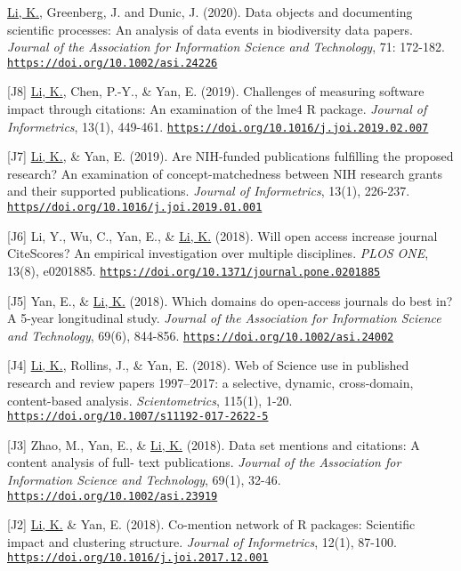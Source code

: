 \documentclass[margin, 10pt]{res} %
\begin{document}
\begin{resume}
[J9] \underline{Li, K.}, Greenberg, J. and Dunic, J. (2020). Data objects and documenting scientific processes: An analysis of data events in biodiversity data papers. \textit{Journal of the Association for Information Science and Technology}, 71: 172-182. \href{https://doi.org/10.1002/asi.24226}{\nolinkurl{https://doi.org/10.1002/asi.24226}}

[J8] \underline{Li, K.}, Chen, P.-Y., \& Yan, E. (2019). Challenges of measuring software impact through citations: An examination of the lme4 R package. \textit{Journal of Informetrics}, 13(1), 449-461. \href{https://doi.org/10.1016/j.joi.2019.02.007}{\nolinkurl{https://doi.org/10.1016/j.joi.2019.02.007}}

[J7] \underline{Li, K.}, \& Yan, E. (2019). Are NIH-funded publications fulfilling the proposed research? An examination of concept-matchedness between NIH research grants and their supported publications. \textit{Journal of Informetrics}, 13(1), 226-237. \href{https//doi.org/10.1016/j.joi.2019.01.001}{\nolinkurl{https//doi.org/10.1016/j.joi.2019.01.001}}

[J6] Li, Y., Wu, C., Yan, E., \& \underline{Li, K.} (2018). Will open access increase journal CiteScores? An empirical investigation over multiple disciplines. \textit{PLOS ONE}, 13(8), e0201885. \href{https://doi.org/10.1371/journal.pone.0201885}{\nolinkurl{https://doi.org/10.1371/journal.pone.0201885}}

[J5] Yan, E., \& \underline{Li, K.} (2018). Which domains do open-access journals do best in? A 5-year longitudinal study. \textit{Journal of the Association for Information Science and Technology}, 69(6), 844-856. \href{https://doi.org/10.1002/asi.24002}{\nolinkurl{https://doi.org/10.1002/asi.24002}}

[J4] \underline{Li, K.}, Rollins, J., \& Yan, E. (2018). Web of Science use in published research and review papers 1997–2017: a selective, dynamic, cross-domain, content-based analysis. \textit{Scientometrics}, 115(1), 1-20. \href{https://doi.org/10.1007/s11192-017-2622-5}{\nolinkurl{https://doi.org/10.1007/s11192-017-2622-5}} 

[J3] Zhao, M., Yan, E., \& \underline{Li, K.} (2018). Data set mentions and citations: A content analysis of full- text publications. \textit{Journal of the Association for Information Science and Technology}, 69(1), 32-46. \href{https://doi.org/10.1002/asi.23919}{\nolinkurl{https://doi.org/10.1002/asi.23919}}

[J2] \underline{Li, K.} \& Yan, E. (2018). Co-mention network of R packages: Scientific impact and clustering structure. \textit{Journal of Informetrics}, 12(1), 87-100. \href{https://doi.org/10.1016/j.joi.2017.12.001}{\nolinkurl{https://doi.org/10.1016/j.joi.2017.12.001}}


\end{resume}
\end{document}
